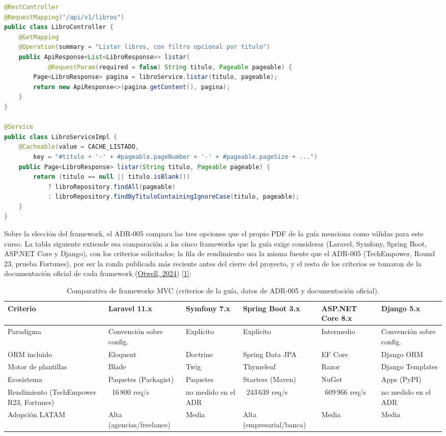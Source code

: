 \documentclass[12pt,a4paper]{article}
\begin{document}
\begin{lstlisting}[language=Java, caption={Controlador, servicio y cache del listado (fragmento real de \texttt{LibroController.java} y \texttt{LibroServiceImpl.java}).}]
@RestController
@RequestMapping("/api/v1/libros")
public class LibroController {
    @GetMapping
    @Operation(summary = "Listar libros, con filtro opcional por titulo")
    public ApiResponse<List<LibroResponse>> listar(
            @RequestParam(required = false) String titulo, Pageable pageable) {
        Page<LibroResponse> pagina = libroService.listar(titulo, pageable);
        return new ApiResponse<>(pagina.getContent(), pagina);
    }
}

@Service
public class LibroServiceImpl {
    @Cacheable(value = CACHE_LISTADO,
        key = "#titulo + '-' + #pageable.pageNumber + '-' + #pageable.pageSize + ...")
    public Page<LibroResponse> listar(String titulo, Pageable pageable) {
        return (titulo == null || titulo.isBlank())
            ? libroRepository.findAll(pageable)
            : libroRepository.findByTituloContainingIgnoreCase(titulo, pageable);
    }
}
\end{lstlisting}

Sobre la elección del framework, el ADR-005 compara las tres opciones que el propio PDF de
la guía menciona como válidas para este curso. La tabla siguiente extiende esa comparación
a los cinco frameworks que la guía exige considerar (Laravel, Symfony, Spring Boot,
ASP.NET Core y Django), con los criterios solicitados; la fila de rendimiento usa la
misma fuente que el ADR-005 (TechEmpower, Round 23, prueba Fortunes), por ser la ronda
publicada más reciente antes del cierre del proyecto, y el resto de los criterios se
tomaron de la documentación oficial de cada framework (\hyperlink{ref:otwell}{Otwell, 2024}) \hyperlink{ieee1}{[1]}:

\begin{table}[H]
\centering
\caption{Comparativa de frameworks MVC (criterios de la guía, datos de ADR-005 y documentación oficial).}
\label{tab:comparativa}
\footnotesize
\setlength{\tabcolsep}{4pt}
\renewcommand{\arraystretch}{1.3}
\begin{tabularx}{\textwidth}{lXXXXX}
\toprule
Criterio & Laravel 11.x & Symfony 7.x & Spring Boot 3.x & ASP.NET Core 8.x & Django 5.x \\
\midrule
Paradigma & Convención sobre config. & Explícito & Explícito & Intermedio & Convención sobre config. \\
ORM incluido & Eloquent & Doctrine & Spring Data JPA & EF Core & Django ORM \\
Motor de plantillas & Blade & Twig & Thymeleaf & Razor & Django Templates \\
Ecosistema & Paquetes (Packagist) & Paquetes & Starters (Maven) & NuGet & Apps (PyPI) \\
Rendimiento (TechEmpower R23, Fortunes) & ~16\,800 req/s & no medido en el ADR & ~243\,639 req/s & ~609\,966 req/s & no medido en el ADR \\
Adopción LATAM & Alta (agencias/freelance) & Media & Alta (empresarial/banca) & Media & Media \\
\bottomrule
\end{tabularx}
\end{table}
\end{document}
